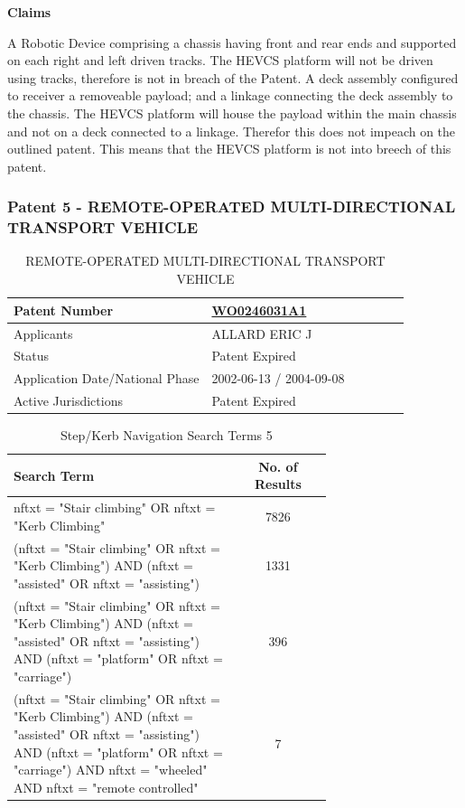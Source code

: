 \documentclass [12pt]{article}
\begin{document}
\textbf{Claims}

A Robotic Device comprising a chassis having front and rear ends and supported on each right and left driven tracks.
The HEVCS platform will not be driven using tracks, therefore is not in breach of the Patent.
A deck assembly configured to receiver a removeable payload; and a linkage connecting the deck assembly to the chassis.
The HEVCS platform will house the payload within the main chassis and not on a deck connected to a linkage. Therefor this does not impeach on the outlined patent.
This means that the HEVCS platform is not into breech of this patent.

\subsubsection{Patent 5 - REMOTE-OPERATED MULTI-DIRECTIONAL TRANSPORT VEHICLE}

\begin{table}[H]
    \centering
    \setlength{\arrayrulewidth}{1.5pt}
    \begin{tabular}{|p{0.5\linewidth}|p{0.5\linewidth}|}
    \hline
    Patent Number & \href{https://worldwide.espacenet.com/patent/search/family/021742047/publication/WO0246031A1?q=WO0246031A1}{WO0246031A1}\\
    \hline
    Applicants & ALLARD ERIC J\\
    \hline
    Status & Patent Expired\\
    \hline
    Application Date/National Phase & 2002-06-13 / 2004-09-08\\
    \hline
    Active Jurisdictions & Patent Expired\\
    \hline
    \end{tabular}
    \caption{REMOTE-OPERATED MULTI-DIRECTIONAL TRANSPORT VEHICLE}
    \label{table:remote_operated_multi_directional_transport_vehicle_patent_information}
\end{table}

\begin{table}[H]
    \centering
    \setlength{\arrayrulewidth}{1.5pt}
    \begin{tabular}{|p{0.7\linewidth}|c|}
    \hline
    \cellcolor{gray!40}Search Term & \cellcolor{gray!40}No. of Results \\
    \hline
    nftxt = "Stair climbing" OR nftxt = "Kerb Climbing" & 7826 \\
    \hline
    (nftxt = "Stair climbing" OR nftxt = "Kerb Climbing") AND (nftxt = "assisted" OR nftxt = "assisting") & 1331 \\
    \hline
    (nftxt = "Stair climbing" OR nftxt = "Kerb Climbing") AND (nftxt = "assisted" OR nftxt = "assisting") AND (nftxt = "platform" OR nftxt = "carriage") & 396 \\
    \hline
    (nftxt = "Stair climbing" OR nftxt = "Kerb Climbing") AND (nftxt = "assisted" OR nftxt = "assisting") AND (nftxt = "platform" OR nftxt = "carriage") AND nftxt = "wheeled" AND nftxt = "remote controlled"& 7 \\
    \hline
    \end{tabular}
    \caption{Step/Kerb Navigation Search Terms 5}
    \label{table:step_Kerb_nav_st_5}
\end{table}
\end{document}
